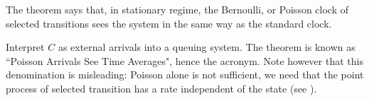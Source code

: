The theorem says that, in stationary regime, the Bernoulli, or
Poisson clock of selected transitions sees the system in the
same way as the standard clock.

Interpret $C$ as external arrivals into a queuing system. The
theorem is known as ``Poisson Arrivals See Time Averages",
hence the acronym. Note however that this denomination is
misleading: Poisson alone is not sufficient, we need that the
point process of selected transition has a rate independent of
the state (see ).

%
%



